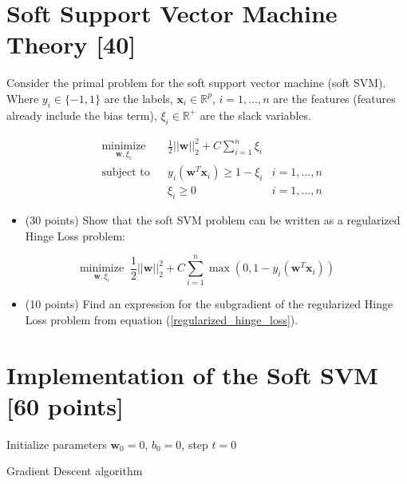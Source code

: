 \section{Soft Support Vector Machine Theory [40]}
\label{prb:hw2::prob1}

Consider the primal problem for the soft support vector machine (soft SVM).  Where $y_i \in \{-1,1\}$ are the labels, $\mathbf{x}_i \in \mathbb{R}^p$, $i=1,\ldots,n$ are the features (features already include the bias term), $\xi_{i} \in \mathbb{R}^{+}$ are the slack variables.

\begin{equation}
\label{soft_svm}
\begin{aligned}
& \underset{\mathbf{w}, \xi_i}{\text{minimize}} && \frac{1}{2}||\mathbf{w}||_2^2 + C\sum_{i=1}^n\xi_i\\
& \text{subject to} && y_i(\mathbf{w}^T\mathbf{x}_i) \geq 1-\xi_i & i = 1,\ldots, n\\
& && \xi_i \geq 0 & i = 1,\ldots, n
\end{aligned}
\end{equation}

\begin{itemize}[(a)]
    \item (30 points) Show that the soft SVM problem can be written as a regularized Hinge Loss problem:
\end{itemize}
\begin{equation}
\label{regularized_hinge_loss}
\underset{\mathbf{w}, \xi_i}{\text{minimize}} \;\; \frac{1}{2}||\mathbf{w}||_2^2 + C \sum_{i=1}^n \max\left(0, 1 - y_{i} (\mathbf{w}^T\mathbf{x}_i) \right)
\end{equation}

\begin{itemize}[(b)]
\label{subgradient}
    \item (10 points) Find an expression for the subgradient of the regularized Hinge Loss problem from equation (\ref{regularized_hinge_loss}).
\end{itemize}


\newpage
\section{Implementation of the Soft SVM [60 points]}
\label{prb:hw2::prob2}

\begin{algorithm}[H]
\SetAlgoLined
{}
Initialize parameters $\mathbf{w}_{0}=0$, $b_{0}=0$, step $t=0$\;
 \caption{Gradient Descent algorithm}
\end{algorithm}

